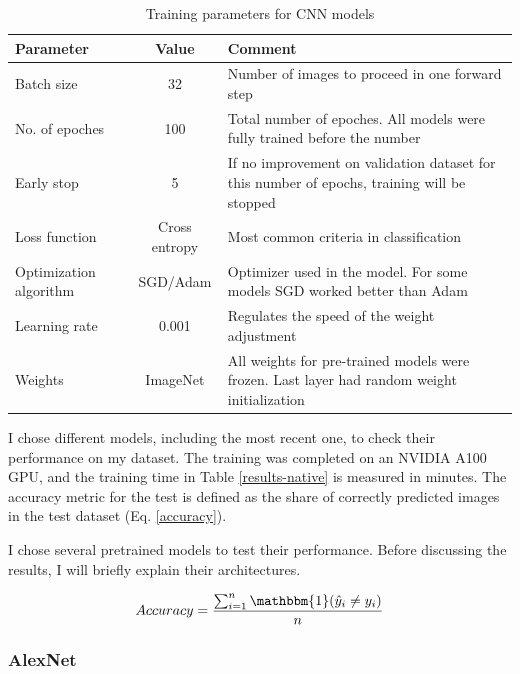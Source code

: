 \documentclass[reqno]{article}
\begin{document}
\begin{table}[ht]
	\caption{Training parameters for CNN models}
	\label{training-params}
	\centering
	\renewcommand{\arraystretch}{1.1}
		\begin{tabular}{
				>{\centering\arraybackslash}p{3.5cm}
				c
				p{6cm}}
			\toprule
				\textbf{Parameter}     & \textbf{Value}     & \textbf{Comment}    \\ \midrule
				Batch size & 32  & Number of images to proceed in one forward step    \\
			No. of epoches     & 100 &  Total number of epoches. All models were fully trained before the number \\
			Early stop     &   5     & If no improvement on validation dataset for this number of epochs, training will be stopped  \\
			Loss function & Cross entropy & Most common criteria in classification \\
			Optimization algorithm & SGD/Adam & Optimizer used in the model. For some models SGD worked better than Adam \\
			Learning rate & 0.001 &  Regulates the speed of the weight adjustment\\
			Weights & ImageNet & All weights for pre-trained models were frozen. Last layer had random weight initialization \\
			\bottomrule
		\end{tabular}
\end{table}

I chose different models, including the most recent one, to check their performance on my dataset. The training was completed on an NVIDIA A100 GPU, and the training time in Table \ref{results-native} is measured in minutes. The accuracy metric for the test is defined as the share of correctly predicted images in the test dataset (Eq. \ref{accuracy}).

I chose several pretrained models to test their performance. Before discussing the results, I will briefly explain their architectures.

\begin{equation}
	\label{accuracy}
	Accuracy = \frac{\sum_{i=1}^n \mathbbm{1}(\hat{y}_i \neq y_i)}{n}
\end{equation}

\subsubsection{AlexNet}
\end{document}
